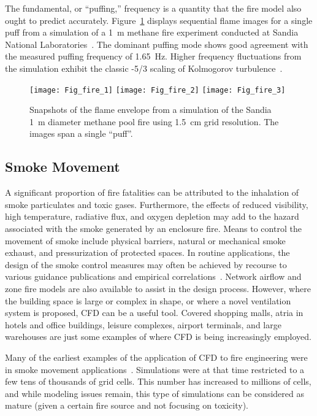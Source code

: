 \documentclass[graybox]{svmult}
\begin{document}
The fundamental, or ``puffing,'' frequency is a quantity that the fire model also ought to predict accurately. Figure~\ref{Sandia_Simulation} displays sequential flame images for a single puff from a simulation of a 1~m methane fire experiment conducted at Sandia National Laboratories~\cite{Tieszen:2002}. The dominant puffing mode shows good agreement with the measured puffing frequency of 1.65~Hz. Higher frequency fluctuations from the simulation exhibit the classic -5/3 scaling of Kolmogorov turbulence~\cite{Pope:2000}.
\begin{figure}[ht]
\begin{center}
\texttt{[image: Fig\_fire\_1]}
\texttt{[image: Fig\_fire\_2]}
\texttt{[image: Fig\_fire\_3]}
\end{center}
\caption{Snapshots of the flame envelope from a simulation of the Sandia 1~m diameter methane pool fire using 1.5~cm grid resolution.  The images span a single ``puff''.}
\label{Sandia_Simulation}
\end{figure}



\subsection{Smoke Movement}

A significant proportion of fire fatalities can be attributed to the inhalation of smoke particulates and toxic gases. Furthermore, the effects of reduced visibility, high temperature, radiative flux, and oxygen depletion may add to the hazard associated with the smoke generated by an enclosure fire. Means to control the movement of smoke include physical barriers, natural or mechanical smoke exhaust, and pressurization of protected spaces. In routine applications, the design of the smoke control measures may often be achieved by recourse to various guidance publications and empirical correlations~\cite{Klote, NFPA:92B}. Network airflow and zone fire models are also available to assist in the design process. However, where the building space is large or complex in shape, or where a novel ventilation system is proposed, CFD can be a useful tool. Covered shopping malls, atria in hotels and office buildings, leisure complexes, airport terminals, and large warehouses are just some examples of where CFD is being increasingly employed.

Many  of  the  earliest  examples  of  the  application of CFD to fire engineering were in smoke movement applications~\cite{Pericleous, Cox:1990}. Simulations were at that time restricted to a few tens of thousands of grid cells. This number has increased to millions of cells, and while modeling issues remain, this type of simulations can be considered as mature (given a certain fire source and not focusing on toxicity).
\end{document}

